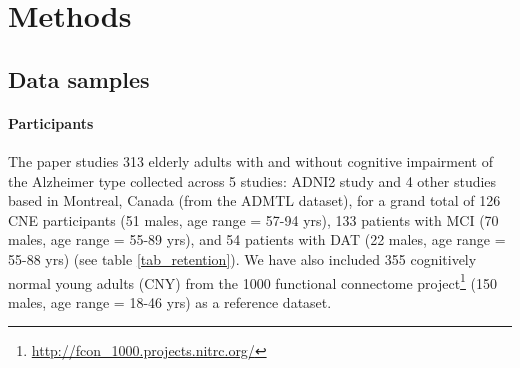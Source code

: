 \documentclass[authoryear]{elsarticle}
\begin{document}
\section{Methods} 

\subsection{Data samples} 
\paragraph{Participants} %

The paper studies 313 elderly adults with and without cognitive impairment of the Alzheimer type collected across 5 studies: ADNI2 study and 4 other studies based in Montreal, Canada (from the ADMTL dataset), for a grand total of 126 CNE participants (51 males, age range = 57-94 yrs), 133 patients with MCI (70 males, age range = 55-89 yrs), and 54 patients with DAT (22 males, age range = 55-88 yrs) (see table \ref{tab_retention}).
We have also included 355 cognitively normal young adults (CNY) from the 1000 functional connectome project\footnote{\url{http://fcon_1000.projects.nitrc.org/}} (150 males, age range = 18-46 yrs) as a reference dataset.
\end{document}
